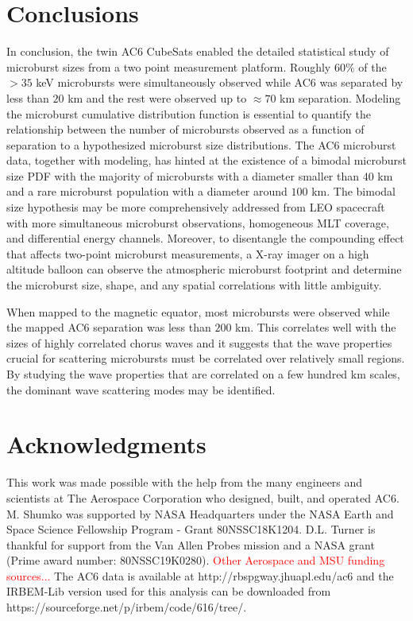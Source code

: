 \section{Conclusions}
In conclusion, the twin AC6 CubeSats enabled the detailed statistical study of microburst sizes from a two point measurement platform. Roughly $60 \%$ of the $> 35$ keV microbursts were simultaneously observed while AC6 was separated by less than $20$ km and the rest were observed up to $\approx 70$ km separation. Modeling the microburst cumulative distribution function is essential to quantify the relationship between the number of microbursts observed as a function of separation to a hypothesized microburst size distributions. The AC6 microburst data, together with modeling, has hinted at the existence of a bimodal microburst size PDF with the majority of microbursts with a diameter smaller than $40$ km and a rare microburst population with a diameter around $100$ km. The bimodal size hypothesis may be more comprehensively addressed from LEO spacecraft with more simultaneous microburst observations, homogeneous MLT coverage, and differential energy channels. Moreover, to disentangle the compounding effect that affects two-point microburst measurements, a X-ray imager on a high altitude balloon can observe the atmospheric microburst footprint and determine the microburst size, shape, and any spatial correlations with little ambiguity. 

When mapped to the magnetic equator, most microbursts were observed while the mapped AC6 separation was less than $200$ km. This correlates well with the sizes of highly correlated chorus waves and it suggests that the wave properties crucial for scattering microbursts must be correlated over relatively small regions. By studying the wave properties that are correlated on a few hundred km scales, the dominant wave scattering modes may be identified.

\section{Acknowledgments}
This work was made possible with the help from the many engineers and scientists at The Aerospace Corporation who designed, built, and operated AC6. M. Shumko was supported by NASA Headquarters under the NASA Earth and Space Science Fellowship Program - Grant 80NSSC18K1204. D.L. Turner is thankful for support from the Van Allen Probes mission and a NASA grant (Prime award number: 80NSSC19K0280). \textcolor{red}{Other Aerospace and MSU funding sources...} The AC6 data is available at http://rbspgway.jhuapl.edu/ac6 and the IRBEM-Lib version used for this analysis can be downloaded from https://sourceforge.net/p/irbem/code/616/tree/.